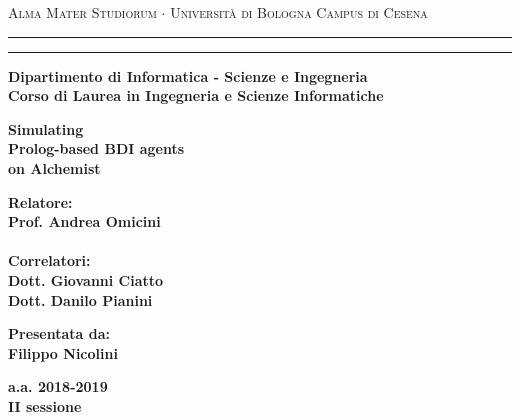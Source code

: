 \documentclass[12pt,a4paper]{report}
\begin{document}
\begin{titlepage}
\begin{center}
{{\Large{\textsc{Alma Mater Studiorum $\cdot$ Universit\`a di Bologna}}}}
{\small{\textsc{Campus di Cesena}}}
\rule[0.1cm]{15.8cm}{0.1mm}
\rule[0.5cm]{15.8cm}{0.6mm}
{\small{\bf Dipartimento di Informatica - Scienze e Ingegneria}}
\\
\medskip
{\small{\bf Corso di Laurea in Ingegneria e Scienze Informatiche}}
\end{center}
\vspace{15mm}
\begin{center}
{\LARGE{\bf Simulating}}\\
\vspace{3mm}
{\LARGE{\bf Prolog-based BDI agents}}\\
\vspace{3mm}
{\LARGE{\bf on Alchemist}}\\
\end{center}
\vspace{40mm}
\par
\noindent
\begin{minipage}[t]{0.47\textwidth}
{\large{\bf Relatore:\\
Prof. Andrea Omicini\\\\}}
{\large{\bf Correlatori:\\
Dott. Giovanni Ciatto\\
Dott. Danilo Pianini
}}
\end{minipage}
\hfill
\begin{minipage}[t]{0.47\textwidth}\raggedleft
{\large{\bf Presentata da:\\
Filippo Nicolini}}
\end{minipage}
\vspace{20mm}
\begin{center}
{\large{\bf
a.a. 2018-2019\\
II sessione}}%
\end{center}
\end{titlepage}
\end{document}
